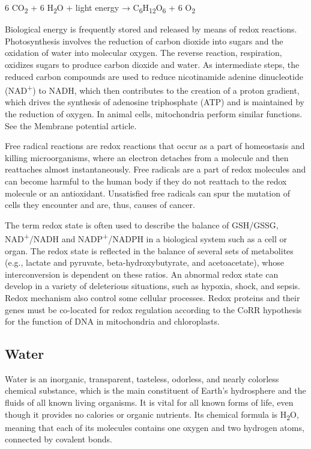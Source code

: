 \documentclass[
]{article}
\begin{document}
6 CO\textsubscript{2} + 6 H\textsubscript{2}O + light energy →
C\textsubscript{6}H\textsubscript{12}O\textsubscript{6} + 6
O\textsubscript{2}

Biological energy is frequently stored and released by means of redox
reactions. Photosynthesis involves the reduction of carbon dioxide into
sugars and the oxidation of water into molecular oxygen. The reverse
reaction, respiration, oxidizes sugars to produce carbon dioxide and
water. As intermediate steps, the reduced carbon compounds are used to
reduce nicotinamide adenine dinucleotide (NAD\textsuperscript{+}) to
NADH, which then contributes to the creation of a proton gradient, which
drives the synthesis of adenosine triphosphate (ATP) and is maintained
by the reduction of oxygen. In animal cells, mitochondria perform
similar functions. See the Membrane potential article.

Free radical reactions are redox reactions that occur as a part of
homeostasis and killing microorganisms, where an electron detaches from
a molecule and then reattaches almost instantaneously. Free radicals are
a part of redox molecules and can become harmful to the human body if
they do not reattach to the redox molecule or an antioxidant.
Unsatisfied free radicals can spur the mutation of cells they encounter
and are, thus, causes of cancer.

The term redox state is often used to describe the balance of GSH/GSSG,
NAD\textsuperscript{+}/NADH and NADP\textsuperscript{+}/NADPH in a
biological system such as a cell or organ. The redox state is reflected
in the balance of several sets of metabolites (e.g., lactate and
pyruvate, beta-hydroxybutyrate, and acetoacetate), whose interconversion
is dependent on these ratios. An abnormal redox state can develop in a
variety of deleterious situations, such as hypoxia, shock, and sepsis.
Redox mechanism also control some cellular processes. Redox proteins and
their genes must be co-located for redox regulation according to the
CoRR hypothesis for the function of DNA in mitochondria and
chloroplasts.

\hypertarget{water}{%
\subsection{Water}\label{water}}

Water is an inorganic, transparent, tasteless, odorless, and nearly
colorless chemical substance, which is the main constituent of Earth's
hydrosphere and the fluids of all known living organisms. It is vital
for all known forms of life, even though it provides no calories or
organic nutrients. Its chemical formula is H\textsubscript{2}O, meaning
that each of its molecules contains one oxygen and two hydrogen atoms,
connected by covalent bonds.
\end{document}
